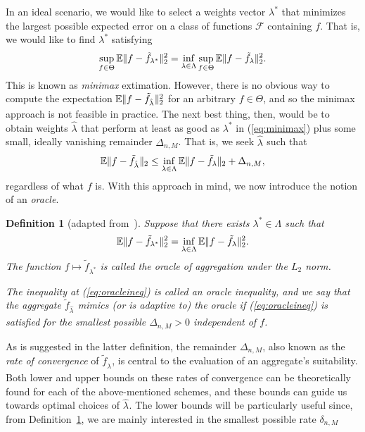 \documentclass[11pt, letter paper]{article}
\newcommand{\1}{\mathmybb{1}}
\newtheorem{definition}{Definition}[section]
\newcommand{\0}{\emptyset}
\newcommand{\E}{\mathbb{E}}
\newcommand{\norm}[1]{|\hspace{-1pt}|#1 |\hspace{-1pt}|}
\newcommand{\normsq}[1]{\norm{#1}^{2}}
\newcommand{\Fcal}{\mathcal{F}}
\newcommand{\ftilde}[1]{\tilde{f}_{#1}}
\newcommand{\lambdahat}[1]{\hat{\lambda}_{#1}}
\begin{document}
In an ideal scenario, we would like to select a weights vector \(\lambda^*\) that minimizes the largest possible expected error on a class of functions \(\Fcal\) containing \(f\). That is, we would like to find \(\lambda^*\) satisfying 
\begin{equation}\label{eq:minimax}
    \sup_{f\in\Theta}\E\normsq{f-\ftilde{\lambda^*}}_{2} = \inf_{\lambda\in\Lambda}\sup_{f\in\Theta}\E\normsq{f-\ftilde{\lambda}}_{2}.
\end{equation}
This is known as \emph{minimax} extimation. 
However, there is no obvious way to compute the expectation \(\E\normsq{f-\ftilde{\lambdahat{}}}_{2}\) for an arbitrary \(f\in\Theta\), and so the minimax approach is not feasible in practice. The next best thing, then, would be to obtain weights \(\lambdahat{}\) that perform at least as good as \(\lambda^*\) in (\ref{eq:minimax}) plus some small, ideally vanishing remainder \(\Delta_{n,M}\). That is, we seek \(\lambdahat{}\) such that
\begin{equation}\label{eq:oracleineq}
    \E\norm{f - \ftilde{\lambdahat{}}}_{2} \leq \inf_{\lambda\in\Lambda}\E\norm{f - \ftilde{\lambda}}_{2} + \Delta_{n,M},
\end{equation}
regardless of what \(f\) is. With this approach in mind, we now introduce the notion of an \emph{oracle}.

\begin{definition}[adapted from~\cite{tsybakov_introduction_2009}]\label{def:oracle}
    Suppose that there exists \(\lambda^{*}\in\Lambda\) such that 
    \[\E\normsq{f-\ftilde{\lambda^{*}}}_{2} = \inf_{\lambda\in\Lambda}\E\normsq{f-\ftilde{\lambda}}_{2}.\]
    The function \(f\mapsto \ftilde{\lambda^{*}}\) is called the oracle of aggregation under the \(L_{2}\) norm.

    The inequality at (\ref{eq:oracleineq}) is called an oracle inequality, and we say that the aggregate \(\ftilde{\lambdahat{}}\) mimics (or is adaptive to) the oracle if (\ref{eq:oracleineq}) is satisfied for the smallest possible \(\Delta_{n,M}>0\) independent of \(f\).
\end{definition}

As is suggested in the latter definition, the remainder \(\Delta_{n,M}\), also known as the \emph{rate of convergence} of \(\ftilde{\lambdahat{}}\), is central to the evaluation of an aggregate's suitability. Both lower and upper bounds on these rates of convergence can be theoretically found for each of the above-mentioned schemes, and these bounds can guide us towards optimal choices of \(\lambdahat{}\). The lower bounds will be particularly useful since, from Definition~\ref{def:oracle}, we are mainly interested in the smallest possible rate \(\delta_{n,M}\)
\end{document}
